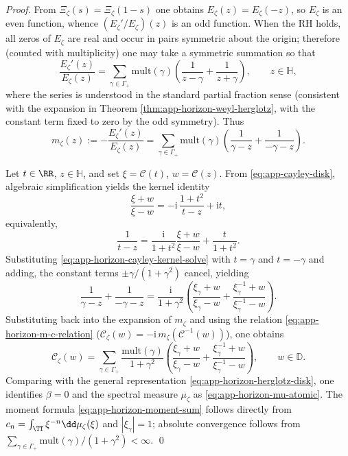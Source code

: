 \begin{proof}
From \(\Xi_{\zeta}(s)=\Xi_{\zeta}(1-s)\) one obtains \(E_{\zeta}(z)=E_{\zeta}(-z)\), so \(E_{\zeta}\) is an even function, whence \((E_{\zeta}'/E_{\zeta})(z)\) is an odd function.
When the RH holds, all zeros of \(E_{\zeta}\) are real and occur in pairs symmetric about the origin; therefore (counted with multiplicity) one may take a symmetric summation so that
\begin{equation}\label{eq:app-horizon-Elog-odd-pf}
\frac{E_{\zeta}'(z)}{E_{\zeta}(z)}
=
\sum_{\gamma\in\Gamma_+}\mathrm{mult}(\gamma)\!\left(\frac{1}{z-\gamma}+\frac{1}{z+\gamma}\right),
\qquad z\in\mathbb{H},
\end{equation}
where the series is understood in the standard partial fraction sense (consistent with the expansion in Theorem \ref{thm:app-horizon-weyl-herglotz}, with the constant term fixed to zero by the odd symmetry).
Thus
\[
m_{\zeta}(z):=-\frac{E_{\zeta}'(z)}{E_{\zeta}(z)}
=
\sum_{\gamma\in\Gamma_+}\mathrm{mult}(\gamma)\!\left(\frac{1}{\gamma-z}+\frac{1}{-\gamma-z}\right).
\]

Let \(t\in\RR\), \(z\in\mathbb{H}\), and set \(\xi=\mathcal{C}(t)\), \(w=\mathcal{C}(z)\).
From \eqref{eq:app-cayley-disk}, algebraic simplification yields the kernel identity
\begin{equation}\label{eq:app-horizon-cayley-kernel-identity}
\frac{\xi+w}{\xi-w}
=-\mathrm{i}\,\frac{1+t^{2}}{t-z}+\mathrm{i}t,
\end{equation}
equivalently,
\begin{equation}\label{eq:app-horizon-cayley-kernel-solve}
\frac{1}{t-z}
=\frac{\mathrm{i}}{1+t^{2}}\frac{\xi+w}{\xi-w}+\frac{t}{1+t^{2}}.
\end{equation}
Substituting \eqref{eq:app-horizon-cayley-kernel-solve} with \(t=\gamma\) and \(t=-\gamma\) and adding, the constant terms \(\pm\gamma/(1+\gamma^2)\) cancel, yielding
\[
\frac{1}{\gamma-z}+\frac{1}{-\gamma-z}
=\frac{\mathrm{i}}{1+\gamma^{2}}
\left(
\frac{\xi_{\gamma}+w}{\xi_{\gamma}-w}
+
\frac{\xi_{\gamma}^{-1}+w}{\xi_{\gamma}^{-1}-w}
\right).
\]
Substituting back into the expansion of \(m_{\zeta}\) and using the relation \eqref{eq:app-horizon-m-c-relation} (\(\mathscr{C}_{\zeta}(w)=-\mathrm{i}\,m_{\zeta}(\mathcal{C}^{-1}(w))\)), one obtains
\[
\mathscr{C}_{\zeta}(w)
=
\sum_{\gamma\in\Gamma_+}\frac{\mathrm{mult}(\gamma)}{1+\gamma^2}
\left(
\frac{\xi_{\gamma}+w}{\xi_{\gamma}-w}
+
\frac{\xi_{\gamma}^{-1}+w}{\xi_{\gamma}^{-1}-w}
\right),
\qquad w\in\mathbb{D}.
\]
Comparing with the general representation \eqref{eq:app-horizon-herglotz-disk}, one identifies \(\beta=0\) and the spectral measure \(\mu_{\zeta}\) as \eqref{eq:app-horizon-mu-atomic}.
The moment formula \eqref{eq:app-horizon-moment-sum} follows directly from \(c_n=\int_{\TT}\xi^{-n}\dd\mu_{\zeta}(\xi)\) and \(|\xi_{\gamma}|=1\); absolute convergence follows from \(\sum_{\gamma\in\Gamma_+}\mathrm{mult}(\gamma)/(1+\gamma^2)<\infty\).
\qed
\end{proof}

